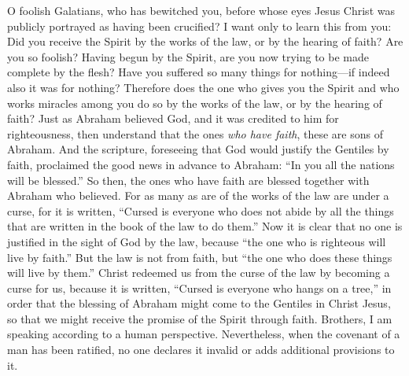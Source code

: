 \begin{biblechapter} %
 O foolish Galatians, who has bewitched you, before whose eyes Jesus Christ was publicly portrayed as having been crucified?
\verse I want only to learn this from you: Did you receive the Spirit by the works of the law, or by the hearing of faith?
\verse Are you so foolish? Having begun by the Spirit, are you now trying to be made complete by the flesh?
\verse Have you suffered so many things for nothing—if indeed also it was for nothing?
\verse Therefore does the one who gives you the Spirit and who works miracles among you do so by the works of the law, or by the hearing of faith?
\verse Just as Abraham believed God, and it was credited to him for righteousness,
\verse then understand that the ones \textit{who have faith}, these are sons of Abraham.
\verse And the scripture, foreseeing that God would justify the Gentiles by faith, proclaimed the good news in advance to Abraham: “In you all the nations will be blessed.”
\verse So then, the ones who have faith are blessed together with Abraham who believed.
\verse For as many as are of the works of the law are under a curse, for it is written, “Cursed is everyone who does not abide by all the things that are written in the book of the law to do them.”
\verse Now it is clear that no one is justified in the sight of God by the law, because “the one who is righteous will live by faith.”
\verse But the law is not from faith, but “the one who does these things will live by them.”
\verse Christ redeemed us from the curse of the law by becoming a curse for us, because it is written, “Cursed is everyone who hangs on a tree,”
\verse in order that the blessing of Abraham might come to the Gentiles in Christ Jesus, so that we might receive the promise of the Spirit through faith.
 Brothers, I am speaking according to a human perspective. Nevertheless, when the covenant of a man has been ratified, no one declares it invalid or adds additional provisions to it.

\end{biblechapter}
